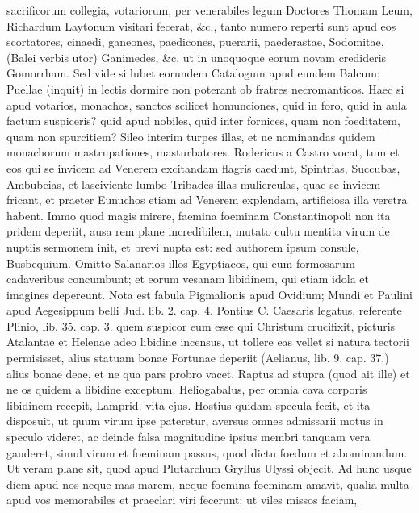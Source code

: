 {sacrificorum collegia, votariorum, per venerabiles legum Doctores
Thomam Leum, Richardum Laytonum visitari fecerat, \&c., tanto numero
reperti sunt apud eos scortatores, cinaedi, ganeones, paedicones,
puerarii, paederastae, Sodomitae, (Balei verbis utor) Ganimedes,
\&c. ut in unoquoque eorum novam credideris Gomorrham. Sed vide si lubet
eorundem Catalogum apud eundem Balcum; Puellae (inquit) in lectis
dormire non poterant ob fratres necromanticos. Haec si apud votarios,
monachos, sanctos scilicet homunciones, quid in foro, quid in aula
factum suspiceris? quid apud nobiles, quid inter fornices, quam non
foeditatem, quam non spurcitiem? Sileo interim turpes illas, et ne
nominandas quidem monachorum  mastrupationes, masturbatores.
Rodericus a Castro vocat, tum et eos qui se invicem ad Venerem
excitandam flagris caedunt, Spintrias, Succubas, Ambubeias, et
lasciviente lumbo Tribades illas mulierculas, quae se invicem fricant,
et praeter Eunuchos etiam ad Venerem explendam, artificiosa illa
veretra habent. Immo quod magis mirere, faemina foeminam
Constantinopoli non ita pridem deperiit, ausa rem plane incredibilem,
mutato cultu mentita virum de nuptiis sermonem init, et brevi nupta
est: sed authorem ipsum consule, Busbequium. Omitto Salanarios
illos Egyptiacos, qui cum formosarum cadaveribus concumbunt; et eorum
vesanam libidinem, qui etiam idola et imagines depereunt. Nota est
fabula Pigmalionis apud Ovidium; Mundi et Paulini apud Aegesippum
belli Jud. lib. 2. cap. 4. Pontius C. Caesaris legatus, referente
Plinio, lib. 35. cap. 3. quem suspicor eum esse qui Christum
crucifixit, picturis Atalantae et Helenae adeo libidine incensus, ut
tollere eas vellet si natura tectorii permisisset, alius statuam bonae
Fortunae deperiit (Aelianus, lib. 9. cap. 37.) alius bonae deae, et ne
qua pars probro vacet. Raptus ad stupra (quod ait ille) et ne
os quidem a libidine exceptum. Heliogabalus, per omnia cava
corporis libidinem recepit, Lamprid. vita ejus. Hostius quidam
specula fecit, et ita disposuit, ut quum virum ipse pateretur, aversus
omnes admissarii motus in speculo videret, ac deinde falsa magnitudine
ipsius membri tanquam vera gauderet, simul virum et foeminam passus,
quod dictu foedum et abominandum. Ut veram plane sit, quod apud
Plutarchum Gryllus Ulyssi objecit. Ad hunc usque diem apud nos
neque mas marem, neque foemina foeminam amavit, qualia multa apud vos
memorabiles et praeclari viri fecerunt: ut viles missos faciam,
}
